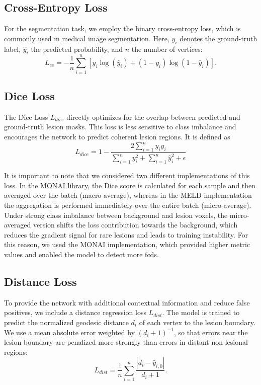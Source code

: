 \documentclass[FCD_GNN.tex]{subfiles}
\begin{document}
\subsection{Cross-Entropy Loss}
For the segmentation task, we employ the binary cross-entropy loss, which is commonly used in medical image segmentation. Here, $y_i$ denotes the ground-truth label, $\hat{y}_i$ the predicted probability, and $n$ the number of vertices:
\[
L_{ce} = - \frac{1}{n} \sum_{i=1}^{n} 
\left[ y_i \log(\hat{y}_i) + (1-y_i)\log(1-\hat{y}_i) \right].
\]


\subsection{Dice Loss}
The Dice Loss $L_{dice}$ directly optimizes for the overlap between predicted and ground-truth lesion masks. This loss is less sensitive to class imbalance and encourages the network to predict coherent lesion regions. It is defined as
\[
L_{dice} = 1 - \frac{2 \sum_{i=1}^n y_i \hat{y}_i}{\sum_{i=1}^n y_i^2 + \sum_{i=1}^n \hat{y}_i^2 + \epsilon}
\]

It is important to note that we considered two different implementations of this loss. 
In the \href{https://docs.monai.io/en/stable/losses.html}{MONAI library}, the Dice score is calculated for each sample and then averaged over the batch (macro-average), 
whereas in the MELD implementation the aggregation is performed immediately over the entire batch (micro-average). 
Under strong class imbalance between background and lesion voxels, the micro-averaged version shifts the loss contribution towards the background, 
which reduces the gradient signal for rare lesions and leads to training instability. 
For this reason, we used the MONAI implementation, which provided higher metric values and enabled the model to detect more \ac{fcd}s.
\subsection{Distance Loss}
To provide the network with additional contextual information and reduce false positives, we include a distance regression loss $L_{dist}$. The model is trained to predict the normalized geodesic distance $d_i$ of each vertex to the lesion boundary. We use a mean absolute error weighted by $(d_i+1)^{-1}$, so that errors near the lesion boundary are penalized more strongly than errors in distant non-lesional regions:
\[
L_{dist} = \frac{1}{n} \sum_{i=1}^{n} \frac{|d_i - \hat{y}_{i,0}|}{d_i + 1}.
\]
\end{document}
